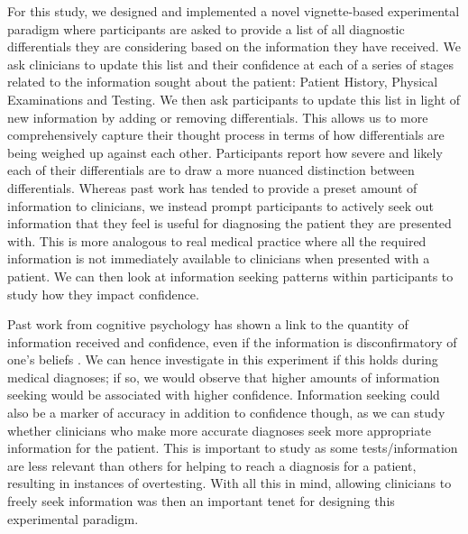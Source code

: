 \documentclass[a4paper, nobind]{templates/ociamthesis}
\begin{document}
\hfill\break
For this study, we designed and implemented a novel vignette-based experimental paradigm where participants are asked to provide a list of all diagnostic differentials they are considering based on the information they have received. We ask clinicians to update this list and their confidence at each of a series of stages related to the information sought about the patient: Patient History, Physical Examinations and Testing. We then ask participants to update this list in light of new information by adding or removing differentials. This allows us to more comprehensively capture their thought process in terms of how differentials are being weighed up against each other. Participants report how severe and likely each of their differentials are to draw a more nuanced distinction between differentials. Whereas past work has tended to provide a preset amount of information to clinicians, we instead prompt participants to actively seek out information that they feel is useful for diagnosing the patient they are presented with. This is more analogous to real medical practice where all the required information is not immediately available to clinicians when presented with a patient. We can then look at information seeking patterns within participants to study how they impact confidence.

\hfill\break
Past work from cognitive psychology has shown a link to the quantity of information received and confidence, even if the information is disconfirmatory of one's beliefs \autocite{ko_divergent_2022}. We can hence investigate in this experiment if this holds during medical diagnoses; if so, we would observe that higher amounts of information seeking would be associated with higher confidence. Information seeking could also be a marker of accuracy in addition to confidence though, as we can study whether clinicians who make more accurate diagnoses seek more appropriate information for the patient. This is important to study as some tests/information are less relevant than others for helping to reach a diagnosis for a patient, resulting in instances of overtesting. With all this in mind, allowing clinicians to freely seek information was then an important tenet for designing this experimental paradigm.
\end{document}

